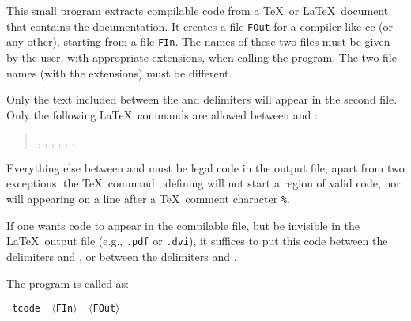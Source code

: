 
\iffalse
 Le programme {\tt tcode} permet de produire du code compilable
\`a partir d'une documentation destin\'ee \`a TEX ou LATEX.
Il produit un fichier {\tt FOut} destin\'e \`a un compilateur tel que Modula-2
(ou autre), \`a partir d'un fichier {\tt FIn} re\c cu \`a l'entr\'ee.
Les noms de ces deux fichiers sont donn\'es par l'usager, avec l'extension,
lors de l'appel du programme.
N'appara\^\i tront dans le second fichier que les parties se trouvant entre
les d\'elimiteurs {\tt\bs{code}} et {\tt\bs{endcode}}.
Toutes les autres commandes TEX et LATEX, m\^eme \`a l'int\'erieur de ces
d\'elimiteurs, seront aussi enlev\'ees.
L'appel se fait sous la forme:
\fi


This small program extracts compilable code from a \TeX\ or \LaTeX\ document
that contains the documentation. 
It creates a file {\tt FOut} for a compiler like cc (or any other), starting
from a file {\tt FIn}. The names of these two files must be given by the user,
with appropriate extensions, when calling the program.
The two file names (with the extensions) must be different.

Only the text included between the {\tt{}} and 
{\tt{}} delimiters will appear in the second file. Only the following
\LaTeX\  commands are allowed between {\tt{}} and {\tt{}}:

\begin{verse}
 {\tt{}}, {\tt{}}, {\tt{}}, {\tt{}},
  {\tt{}},   {\tt{}}.
\end{verse}

Everything else between
{\tt{}} and {\tt{}} must be legal code in the 
output file, apart from two exceptions: the \TeX\  command
 {\tt{}}, defining  {\tt{}} will not start a region
 of valid code, nor will  {\tt{}} appearing on a line after a
 \TeX\  comment character {\tt\%}.

If one wants code to appear in the compilable file, but be invisible in the 
\LaTeX\ output file (e.g., {\tt .pdf} or {\tt .dvi}), 
it suffices to put this code between the delimiters
{\tt{}} and {\tt{}}, or between the delimiters
{\tt{}} and {\tt{}}.

The program is called as:

\begin {center}\tt
  tcode \ $\langle$FIn$\rangle$ \ $\langle$FOut$\rangle$
\end {center}

